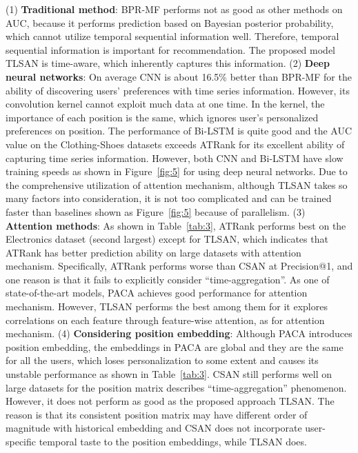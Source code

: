 \documentclass[preprint,12pt]{elsarticle}
\newcommand{\tool}{TLSAN\xspace}
\begin{document}
\begin{sloppypar}
(1) \textbf{Traditional method}: BPR-MF performs not as good as other methods on AUC, because it performs prediction based on Bayesian posterior probability, which cannot utilize temporal sequential information well. Therefore, temporal sequential information is important for recommendation. The proposed model \tool is time-aware, which inherently captures this information. 
(2) \textbf{Deep neural networks}: On average CNN is about 16.5\% better than BPR-MF for the ability of discovering users' preferences with time series information. However, its convolution kernel cannot exploit much data at one time. In the kernel, the importance of each position is the same, which ignores user's personalized preferences on position. The performance of Bi-LSTM is quite good and the AUC value on the Clothing-Shoes datasets exceeds ATRank for its excellent ability of capturing time series information. However, both CNN and Bi-LSTM have slow training speeds as shown in Figure~\ref{fig:5} for using deep neural networks. Due to the comprehensive utilization of attention mechanism, although \tool takes so many factors into consideration, it is not too complicated and can be trained faster than baselines shown as Figure~\ref{fig:5} because of parallelism. 
(3) \textbf{Attention methods}: As shown in Table~\ref{tab:3}, ATRank performs best on the Electronics dataset (second largest) except for \tool, which indicates that ATRank has better prediction ability on large datasets with attention mechanism. Specifically, ATRank performs worse than CSAN at Precision@1, and one reason is that it fails to explicitly consider ``time-aggregation''. As one of state-of-the-art models, PACA achieves good performance for attention mechanism. However, \tool performs the best among them for it explores correlations on each feature through feature-wise attention, as for attention mechanism. 
(4) \textbf{Considering position embedding}: Although PACA introduces position embedding, the embeddings in PACA are global and they are the same for all the users, which loses personalization to some extent and causes its unstable performance as shown in Table~\ref{tab:3}. CSAN still performs well on large datasets for the position matrix describes ``time-aggregation'' phenomenon. However, it does not perform as good as the proposed approach \tool. The reason is that its consistent position matrix may have different order of magnitude with historical embedding and CSAN does not incorporate user-specific temporal taste to the position embeddings, while \tool does. 

\end{sloppypar}
\end{document}
